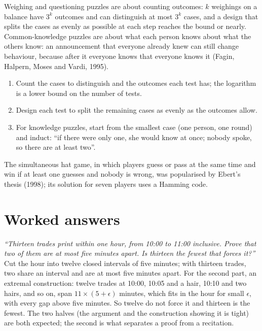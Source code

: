 Weighing and questioning puzzles are about counting outcomes: $k$ weighings on a balance have $3^k$ outcomes and
can distinguish at most $3^k$ cases, and a design that splits the cases as evenly as possible at each step
reaches the bound or nearly. Common-knowledge puzzles are about what each person knows about what the others
know: an announcement that everyone already knew can still change behaviour, because after it everyone knows that
everyone knows it (Fagin, Halpern, Moses and Vardi, 1995).

\begin{method}\label{met:iv:brainteasers-and-logic:info}
\begin{enumerate}
\item Count the cases to distinguish and the outcomes each test has; the logarithm is a lower bound on the
number of tests.
\item Design each test to split the remaining cases as evenly as the outcomes allow.
\item For knowledge puzzles, start from the smallest case (one person, one round) and induct: ``if there were
only one, she would know at once; nobody spoke, so there are at least two''.
\end{enumerate}
\end{method}

The simultaneous hat game, in which players guess or pass at the same time and win if at least one guesses and
nobody is wrong, was popularised by Ebert's thesis (1998); its solution for seven players uses a Hamming code.

\section{Worked answers}

\begin{example}\label{ex:iv:brainteasers-and-logic:gaps}
\emph{``Thirteen trades print within one hour, from 10:00 to 11:00 inclusive. Prove that two of them are at most five
minutes apart. Is thirteen the fewest that forces it?''} Cut the hour into twelve closed intervals of five minutes; with
thirteen trades, two share an interval and are at most five minutes apart. For the second part, an extremal
construction: twelve trades at 10:00, 10:05 and a hair, 10:10 and two hairs, and so on, span $11 \times (5 + \epsilon)$
minutes, which fits in the hour for small $\epsilon$, with every gap above five minutes. So twelve do not force it and
thirteen is the fewest. The two halves (the argument and the construction showing it is tight) are both expected;
the second is what separates a proof from a recitation.
\end{example}

